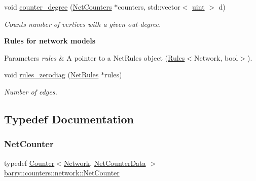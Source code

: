 \begin{Indent}
\begin{DoxyCompactItemize}
void \hyperlink{namespacebarry_1_1counters_1_1network_a3d7953d9b68c547fc0d02cc1f6fadb23}{counter\+\_\+degree} (\hyperlink{namespacebarry_1_1counters_1_1network_aa72fdb34752ac24167a06ee196a8fff6}{Net\+Counters} $\ast$counters, std\+::vector$<$ \hyperlink{namespacebarry_a11dfc53ddb4672278319aa04f1e09a6c}{uint} $>$ d)
\begin{DoxyCompactList}\small\item\em Counts number of vertices with a given out-\/degree. \end{DoxyCompactList}\end{DoxyCompactItemize}
\end{Indent}
\begin{Indent}\textbf{ Rules for network models}\par
{\em 
\begin{DoxyParams}{Parameters}
{\em rules} & A pointer to a {\ttfamily Net\+Rules} object ({\ttfamily \hyperlink{classbarry_1_1_rules}{Rules}}$<${\ttfamily Network}, {\ttfamily bool}$>$). \\
\hline
\end{DoxyParams}
}\begin{DoxyCompactItemize}
\item 
void \hyperlink{namespacebarry_1_1counters_1_1network_a19680c70c20a093a84b6cc71a2597510}{rules\+\_\+zerodiag} (\hyperlink{namespacebarry_1_1counters_1_1network_adbdb20b3ce883777da2364984ea10c56}{Net\+Rules} $\ast$rules)
\begin{DoxyCompactList}\small\item\em Number of edges. \end{DoxyCompactList}\end{DoxyCompactItemize}
\end{Indent}


\subsection{Typedef Documentation}
\mbox{\label{namespacebarry_1_1counters_1_1network_a067bd9de04608fc2e1586324d3864a45}} 
\subsubsection{\texorpdfstring{Net\+Counter}{NetCounter}}
{\footnotesize\ttfamily typedef \hyperlink{classbarry_1_1_counter}{Counter}$<$\hyperlink{namespacebarry_1_1counters_1_1network_a4cb88d4572ded3b447ea269c9cd0b2c0}{Network}, \hyperlink{classbarry_1_1counters_1_1network_1_1_net_counter_data}{Net\+Counter\+Data} $>$ \hyperlink{namespacebarry_1_1counters_1_1network_a067bd9de04608fc2e1586324d3864a45}{barry\+::counters\+::network\+::\+Net\+Counter}}



